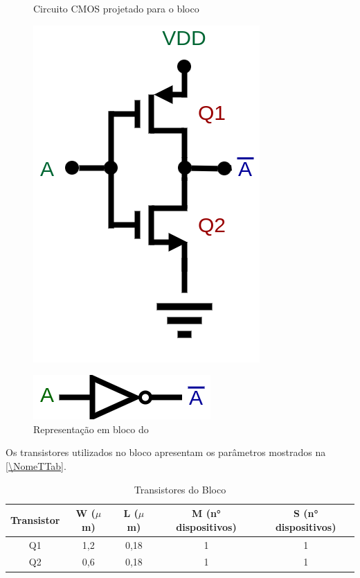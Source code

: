 \begin{figure}[htb]
 \label{NomePFig}
 \centering
  \begin{minipage}{0.4\textwidth}
    \centering
    \caption{Circuito CMOS projetado para o bloco \NomeBloco} \label{\NomePFig}
    \includegraphics[scale=0.4]{Circuitos/NOT.png}
  \end{minipage}
  \hfill
  \begin{minipage}{0.4\textwidth}
    \centering
    \caption{Representa{\c c}\~ao em bloco do \NomeBloco} \label{NomeSFig}
    \includegraphics[scale=0.5]{Circuitos/NOT_block.png}
  \end{minipage}
\end{figure}

Os transistores utilizados no bloco \NomeBloco{} apresentam os par\^ametros mostrados na \autoref{\NomeTTab}.

\begin{table}[htbp]
\caption{Transistores do Bloco \NomeBloco}
\label{\NomeTTab}
\centering
\begin{tabular}{ccccc}
\toprule
Transistor & W ($\mu$m)  & L ($\mu$m)           & M (n° dispositivos) & S (n° dispositivos)\\
\midrule \midrule
Q1 & 1,2 & 0,18 & 1 & 1\\
\midrule
Q2 & 0,6 & 0,18 & 1 & 1\\
\bottomrule
\end{tabular}
\end{table}
\clearpage